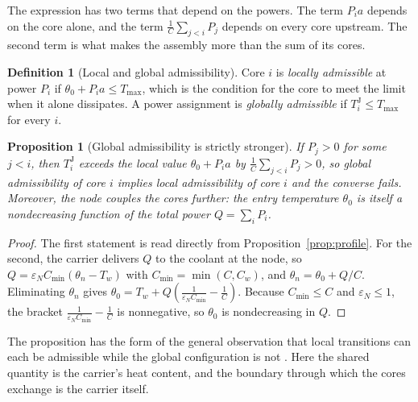 \documentclass[11pt,openany]{book}
\theoremstyle{plain}
\newtheorem{proposition}[theorem]{Proposition}
\theoremstyle{definition}
\newtheorem{definition}[theorem]{Definition}
\theoremstyle{remark}
\begin{document}
The expression has two terms that depend on the powers. The term $P_i a$ depends on the core alone, and the term $\frac1C\sum_{j<i}P_j$ depends on every core upstream. The second term is what makes the assembly more than the sum of its cores.

\begin{definition}[Local and global admissibility]
Core $i$ is \emph{locally admissible} at power $P_i$ if $\theta_0+P_ia\le T_{\max}$, which is the condition for the core to meet the limit when it alone dissipates. A power assignment is \emph{globally admissible} if $T^{\mathrm J}_i\le T_{\max}$ for every $i$.
\end{definition}

\begin{proposition}[Global admissibility is strictly stronger]\label{prop:global}
If $P_j>0$ for some $j<i$, then $T^{\mathrm J}_i$ exceeds the local value $\theta_0+P_ia$ by $\frac1C\sum_{j<i}P_j>0$, so global admissibility of core $i$ implies local admissibility of core $i$ and the converse fails. Moreover, the node couples the cores further: the entry temperature $\theta_0$ is itself a nondecreasing function of the total power $Q=\sum_i P_i$.
\end{proposition}
\begin{proof}
The first statement is read directly from Proposition~\ref{prop:profile}. For the second, the carrier delivers $Q$ to the coolant at the node, so $Q=\varepsilon_N C_{\min}(\theta_n-T_w)$ with $C_{\min}=\min(C,C_w)$, and $\theta_n=\theta_0+Q/C$. Eliminating $\theta_n$ gives $\theta_0=T_w+Q\left(\frac{1}{\varepsilon_N C_{\min}}-\frac1C\right)$. Because $C_{\min}\le C$ and $\varepsilon_N\le1$, the bracket $\frac{1}{\varepsilon_N C_{\min}}-\frac1C$ is nonnegative, so $\theta_0$ is nondecreasing in $Q$.
\end{proof}

The proposition has the form of the general observation that local transitions can each be admissible while the global configuration is not \cite{flyxion-local}. Here the shared quantity is the carrier's heat content, and the boundary through which the cores exchange is the carrier itself.
\end{document}
